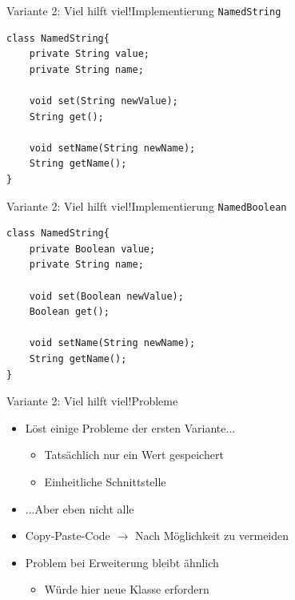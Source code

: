 \begin{frame}[fragile]{Variante 2: Viel hilft viel!}{Implementierung \texttt{NamedString}}
\lstset{style=javacode}
\begin{lstlisting}
class NamedString{
    private String value;
    private String name;
    
    void set(String newValue);
    String get();
    
    void setName(String newName);
    String getName();
}
\end{lstlisting}
\end{frame}

\begin{frame}[fragile]{Variante 2: Viel hilft viel!}{Implementierung \texttt{NamedBoolean}}
\lstset{style=javacode}
\begin{lstlisting}
class NamedString{
    private Boolean value;
    private String name;
    
    void set(Boolean newValue);
    Boolean get();
    
    void setName(String newName);
    String getName();
}
\end{lstlisting}
\end{frame}

\begin{frame}{Variante 2: Viel hilft viel!}{Probleme}
\begin{itemize}
    \item Löst einige Probleme der ersten Variante...
    \begin{itemize}
        \item Tatsächlich nur ein Wert gespeichert
        \item Einheitliche Schnittstelle
    \end{itemize}
    \item ...Aber eben nicht alle
    \item Copy-Paste-Code $\rightarrow$ Nach Möglichkeit zu vermeiden
    \item Problem bei Erweiterung bleibt ähnlich
    \begin{itemize}
        \item Würde hier neue Klasse erfordern
    \end{itemize}
\end{itemize}
\end{frame}



